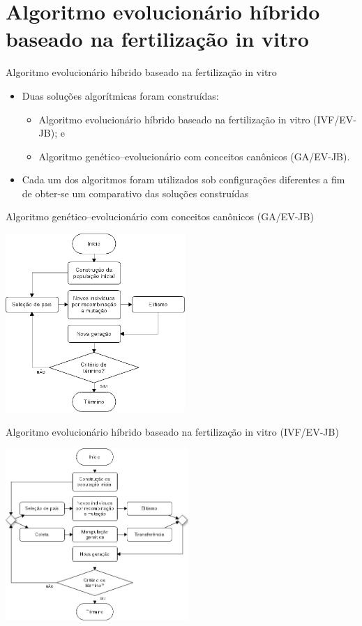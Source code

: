 \documentclass{beamer}
\begin{document}
\section{Algoritmo evolucion\'{a}rio h\'{i}brido baseado na fertiliza\c{c}\~{a}o in vitro}
\begin{frame}{Algoritmo evolucion\'{a}rio h\'{i}brido baseado na fertiliza\c{c}\~{a}o in vitro}
\begin{itemize}
\item<1-> Duas soluções algorítmicas foram construídas:
\begin{itemize}
\item<2-> Algoritmo evolucionário híbrido baseado na fertilização in vitro (IVF/EV-JB); e
\item<3-> Algoritmo genético--evolucionário com conceitos canônicos (GA/EV-JB).
\end{itemize}
\item<4-> Cada um dos algoritmos foram utilizados sob configurações diferentes a fim de obter-se
um comparativo das soluções construídas
\end{itemize}
\end{frame}
\begin{frame}{Algoritmo genético--evolucionário com conceitos canônicos (GA/EV-JB)}
\begin{center} 
  \includegraphics[width=0.51\textwidth]{../imgs/ga-ev.png}
\end{center} 
\end{frame}
\begin{frame}{Algoritmo evolucionário híbrido baseado na fertilização in vitro (IVF/EV-JB)}
\begin{center} 
  \includegraphics[width=0.52\textwidth]{../imgs/ivf-ev.png}
\end{center} 
\end{frame}
\end{document}
